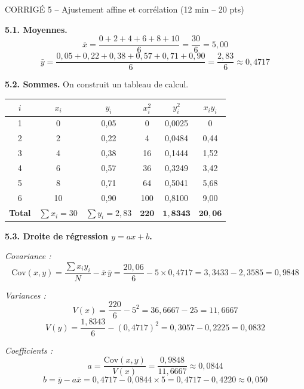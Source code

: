 \documentclass[11pt,a4paper]{article}
\begin{document}
\newpage

\begin{epreuve}{CORRIGÉ 5 -- Ajustement affine et corrélation \hfill \small (12 min -- 20 pts)}

\vspace{0.2cm}
\textbf{5.1. Moyennes.}
$$\bar{x} = \frac{0+2+4+6+8+10}{6} = \frac{30}{6} = 5{,}00$$
$$\bar{y} = \frac{0{,}05+0{,}22+0{,}38+0{,}57+0{,}71+0{,}90}{6} = \frac{2{,}83}{6} \approx 0{,}4717$$

\vspace{0.3cm}
\textbf{5.2. Sommes.} On construit un tableau de calcul.

\begin{center}
\small
\renewcommand{\arraystretch}{1.35}
\begin{tabular}{|c|c|c|c|c|c|}
\hline
\rowcolor{corrige!15}
$i$ & $x_i$ & $y_i$ & $x_i^2$ & $y_i^2$ & $x_i y_i$ \\
\hline
1 & 0 & 0{,}05 & 0 & 0{,}0025 & 0 \\
\hline
2 & 2 & 0{,}22 & 4 & 0{,}0484 & 0{,}44 \\
\hline
3 & 4 & 0{,}38 & 16 & 0{,}1444 & 1{,}52 \\
\hline
4 & 6 & 0{,}57 & 36 & 0{,}3249 & 3{,}42 \\
\hline
5 & 8 & 0{,}71 & 64 & 0{,}5041 & 5{,}68 \\
\hline
6 & 10 & 0{,}90 & 100 & 0{,}8100 & 9{,}00 \\
\hline
\rowcolor{corrige!15}
\textbf{Total} & $\sum x_i=30$ & $\sum y_i=2{,}83$ & $\mathbf{220}$ & $\mathbf{1{,}8343}$ & $\mathbf{20{,}06}$ \\
\hline
\end{tabular}
\end{center}

\vspace{0.3cm}
\textbf{5.3. Droite de régression $y = ax + b$.}

\emph{Covariance :}
$$\mathrm{Cov}(x,y) = \frac{\sum x_i y_i}{N} - \bar{x}\,\bar{y} = \frac{20{,}06}{6} - 5 \times 0{,}4717 = 3{,}3433 - 2{,}3585 = 0{,}9848$$

\emph{Variances :}
$$V(x) = \frac{220}{6} - 5^2 = 36{,}6667 - 25 = 11{,}6667$$
$$V(y) = \frac{1{,}8343}{6} - (0{,}4717)^2 = 0{,}3057 - 0{,}2225 = 0{,}0832$$

\emph{Coefficients :}
$$a = \frac{\mathrm{Cov}(x,y)}{V(x)} = \frac{0{,}9848}{11{,}6667} \approx 0{,}0844$$
$$b = \bar{y} - a\bar{x} = 0{,}4717 - 0{,}0844 \times 5 = 0{,}4717 - 0{,}4220 \approx 0{,}050$$


\end{epreuve}
\end{document}
